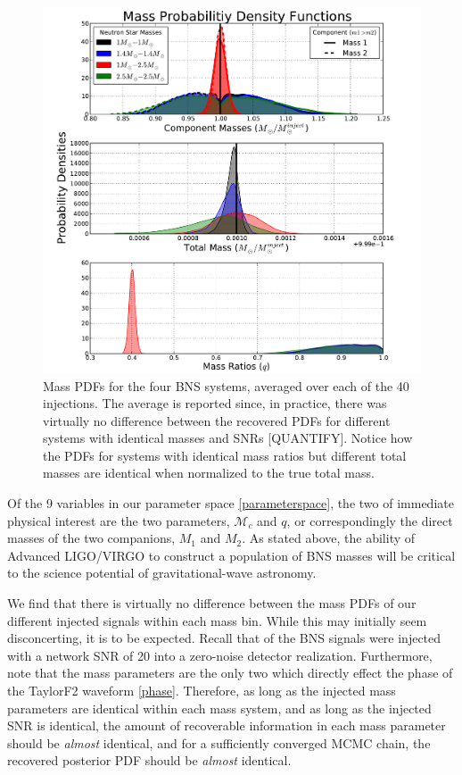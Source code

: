 \documentclass[11pt,a4paper]{emulateapj}
\newcommand{\carl}[1]{{\color{red}  #1}}
\newcommand{\chmass}{\mathcal{M}_c}
\begin{document}
\begin{figure}[ht!]
  \centering
 \includegraphics[trim=2cm 0cm 2cm 0cm, clip=false,scale=0.7]{newMasses.pdf}
 \caption{Mass PDFs for the four BNS systems, averaged over each of the 40 injections.  The average is reported since, in practice, there was virtually no difference between the recovered PDFs for different systems with identical masses and SNRs \carl{[QUANTIFY]}.  Notice how the PDFs for systems with identical mass ratios but different total masses are identical when normalized to the true total mass.}
  \label{metaMassPDFs}
\end{figure}

Of the 9 variables in our parameter space \eqref{parameterspace}, the two of immediate physical
interest are the two parameters, $\chmass$ and $q$, or correspondingly the direct masses 
of the two companions, $M_1$ and $M_2$.    As stated above, the ability of
Advanced LIGO/VIRGO to construct a population of BNS masses will be critical to the science
potential of gravitational-wave astronomy.  

We find that there is virtually no difference between the mass PDFs of our different injected signals
within each mass bin.  While this may initially seem disconcerting, it is to be expected.  Recall that of the BNS signals were injected with a network SNR of 20 into a zero-noise detector realization.  Furthermore, note that the mass parameters are the only two which directly effect the phase of the TaylorF2 waveform \eqref{phase}.  Therefore, as long as the injected mass parameters are identical within each mass system, and as long as the injected SNR is identical, the amount of recoverable information in each mass parameter should be \emph{almost} identical, and for a sufficiently converged MCMC chain, the recovered posterior PDF should be \emph{almost} identical.  
\end{document}
